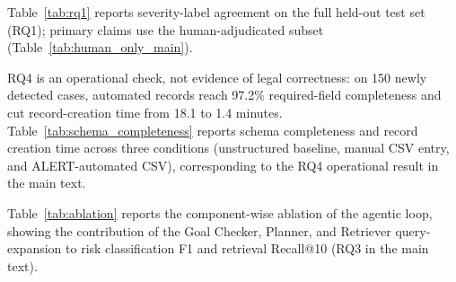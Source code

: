 Table~\ref{tab:rq1} reports severity-label agreement on the full held-out test set (RQ1); primary claims use the human-adjudicated subset (Table~\ref{tab:human_only_main}).

RQ4 is an operational check, not evidence of legal correctness: on 150 newly detected cases, automated records reach 97.2\% required-field completeness and cut record-creation time from 18.1 to 1.4 minutes. Table~\ref{tab:schema_completeness} reports schema completeness and record creation time across three conditions (unstructured baseline, manual CSV entry, and ALERT-automated CSV), corresponding to the RQ4 operational result in the main text.

\begin{table}[h]
\centering
\caption{Schema completeness and record creation time across three conditions. Referenced from the main text (RQ4).}
\label{tab:schema_completeness}
\small
\setlength{\tabcolsep}{4pt}
\end{table}

Table~\ref{tab:ablation} reports the component-wise ablation of the agentic loop, showing the contribution of the Goal Checker, Planner, and Retriever query-expansion to risk classification F1 and retrieval Recall@10 (RQ3 in the main text).

\begin{table}[h]
\centering
\caption{Agentic-loop ablation: component-wise contribution to risk classification F1 and retrieval Recall@10 (mean over 5 evaluation runs). Referenced from the main text (RQ3).}
\label{tab:ablation}
\small
\setlength{\tabcolsep}{4pt}
\end{table}

